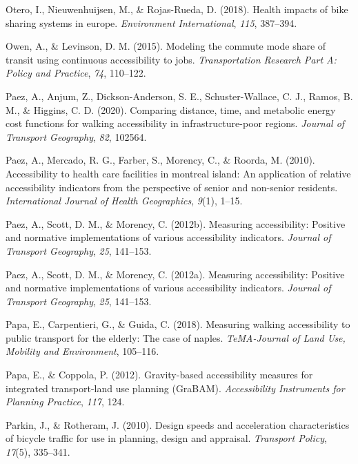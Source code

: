 \documentclass[
11pt, %
oneside, %
english, %
singlespacing, %
]{macthesis} %
\newlength{\cslhangindent}
\newenvironment{CSLReferences}[2] %
{\begin{list}{}{%
	\setlength{\itemindent}{0pt}
	\setlength{\leftmargin}{0pt}
	\setlength{\parsep}{0pt}
	\ifodd #1
	\setlength{\leftmargin}{\cslhangindent}
	\setlength{\itemindent}{-1\cslhangindent}
	\fi
	\setlength{\itemsep}{#2\baselineskip}}}
{\end{list}}
\begin{document}
\begin{CSLReferences}{1}{0}
Otero, I., Nieuwenhuijsen, M., \& Rojas-Rueda, D. (2018). Health impacts of bike sharing systems in europe. \emph{Environment International}, \emph{115}, 387--394.

Owen, A., \& Levinson, D. M. (2015). Modeling the commute mode share of transit using continuous accessibility to jobs. \emph{Transportation Research Part A: Policy and Practice}, \emph{74}, 110--122.

Paez, A., Anjum, Z., Dickson-Anderson, S. E., Schuster-Wallace, C. J., Ramos, B. M., \& Higgins, C. D. (2020). Comparing distance, time, and metabolic energy cost functions for walking accessibility in infrastructure-poor regions. \emph{Journal of Transport Geography}, \emph{82}, 102564.

Paez, A., Mercado, R. G., Farber, S., Morency, C., \& Roorda, M. (2010). Accessibility to health care facilities in montreal island: An application of relative accessibility indicators from the perspective of senior and non-senior residents. \emph{International Journal of Health Geographics}, \emph{9}(1), 1--15.

Paez, A., Scott, D. M., \& Morency, C. (2012b). Measuring accessibility: Positive and normative implementations of various accessibility indicators. \emph{Journal of Transport Geography}, \emph{25}, 141--153.

Paez, A., Scott, D. M., \& Morency, C. (2012a). Measuring accessibility: Positive and normative implementations of various accessibility indicators. \emph{Journal of Transport Geography}, \emph{25}, 141--153.

Papa, E., Carpentieri, G., \& Guida, C. (2018). Measuring walking accessibility to public transport for the elderly: The case of naples. \emph{TeMA-Journal of Land Use, Mobility and Environment}, 105--116.

Papa, E., \& Coppola, P. (2012). Gravity-based accessibility measures for integrated transport-land use planning (GraBAM). \emph{Accessibility Instruments for Planning Practice}, \emph{117}, 124.

Parkin, J., \& Rotheram, J. (2010). Design speeds and acceleration characteristics of bicycle traffic for use in planning, design and appraisal. \emph{Transport Policy}, \emph{17}(5), 335--341.


\end{CSLReferences}
\end{document}
